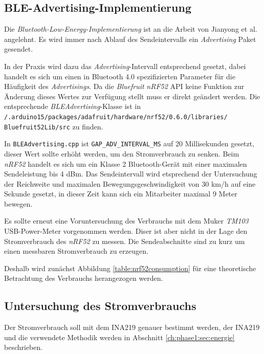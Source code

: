 \subsection{BLE-Advertising-Implementierung}
\label{ch:phase3:sec:advertising}
Die \emph{Bluetooth-Low-Energy-Implementierung} ist an die Arbeit von Jianyong et al. angelehnt.
Es wird immer nach Ablauf des Sendeintervalls ein \emph{Advertising} Paket gesendet.

In der Praxis wird dazu das \emph{Advertising}-Intervall entsprechend gesetzt, dabei handelt es sich um einen in Bluetooth 4.0 spezifizierten Parameter für die Häufigkeit des \emph{Advertisings}.
Da die \emph{Bluefruit} \emph{nRF52} API keine Funktion zur Änderung dieses Wertes zur Verfügung stellt muss er direkt geändert werden.
Die entsprechende \emph{BLEAdvertising}-Klasse ist in \\\texttt{/.arduino15/packages/adafruit/hardware/nrf52/0.6.0/libraries/}\\\texttt{Bluefruit52Lib/src} zu finden. 

In \texttt{BLEAdvertising.cpp} ist \texttt{GAP\_ADV\_INTERVAL\_MS} auf 20 Millisekunden gesetzt, dieser Wert sollte erhöht werden, um den Stromverbrauch zu senken.
Beim \emph{nRF52} handelt es sich um ein Klasse 2 Bluetooth-Gerät mit einer maximalen Sendeleistung bis 4 dBm.
Das Sendeintervall wird etsprechend der Untersuchung der Reichweite und maximalen Bewegungsgeschwindigkeit von 30 km/h auf eine Sekunde gesetzt, in dieser Zeit kann sich ein Mitarbeiter maximal 9 Meter bewegen.

Es sollte erneut eine Voruntersuchung des Verbrauchs mit dem Muker \emph{TM103} USB-Power-Meter vorgenommen werden.
Diser ist aber nicht in der Lage den Stromverbrauch des \emph{nRF52} zu messen.
Die Sendeabschnitte sind zu kurz um einen messbaren Stromverbrauch zu erzeugen.

Deshalb wird zunächst Abbildung \ref{table:nrf52consumption} für eine theoretische Betrachtung des Verbrauchs herangezogen werden. 




\subsection{Untersuchung des Stromverbrauchs}
Der Stromverbrauch soll mit dem INA219 genauer bestimmt werden, der INA219 und die verwendete Methodik werden in Abschnitt \ref{ch:phase1:sec:energie} beschrieben.

